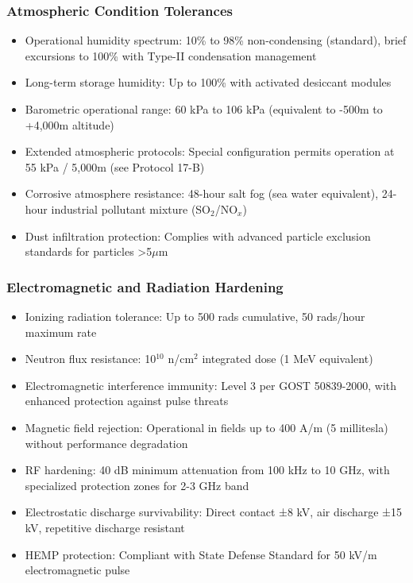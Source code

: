 \documentclass[12pt]{article}
\begin{document}
\subsubsection{Atmospheric Condition Tolerances}
\begin{itemize}
    \item Operational humidity spectrum: 10\% to 98\% non-condensing (standard), brief excursions to 100\% with Type-II condensation management
    \item Long-term storage humidity: Up to 100\% with activated desiccant modules
    \item Barometric operational range: 60 kPa to 106 kPa (equivalent to -500m to +4,000m altitude)
    \item Extended atmospheric protocols: Special configuration permits operation at 55 kPa / 5,000m (see Protocol 17-B)
    \item Corrosive atmosphere resistance: 48-hour salt fog (sea water equivalent), 24-hour industrial pollutant mixture (SO$_2$/NO$_x$)
    \item Dust infiltration protection: Complies with advanced particle exclusion standards for particles >5$\mu$m
\end{itemize}

\subsubsection{Electromagnetic and Radiation Hardening}
\begin{itemize}
    \item Ionizing radiation tolerance: Up to 500 rads cumulative, 50 rads/hour maximum rate
    \item Neutron flux resistance: 10$^{10}$ n/cm$^2$ integrated dose (1 MeV equivalent)
    \item Electromagnetic interference immunity: Level 3 per GOST 50839-2000, with enhanced protection against pulse threats
    \item Magnetic field rejection: Operational in fields up to 400 A/m (5 millitesla) without performance degradation
    \item RF hardening: 40 dB minimum attenuation from 100 kHz to 10 GHz, with specialized protection zones for 2-3 GHz band
    \item Electrostatic discharge survivability: Direct contact ±8 kV, air discharge ±15 kV, repetitive discharge resistant
    \item HEMP protection: Compliant with State Defense Standard for 50 kV/m electromagnetic pulse
\end{itemize}
\end{document}
